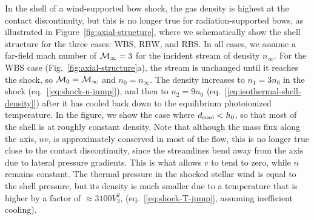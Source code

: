 In the shell of a wind-supported bow shock, the gas density is highest
at the contact discontinuity, but this is no longer true for
radiation-supported bows, as illustrated in
Figure~\ref{fig:axial-structure}, where we schematically show the
shell structure for the three cases: WBS, RBW, and RBS.  In all cases,
we assume a far-field mach number of \(\mathcal{M}_\infty = 3\) for the incident
stream of density \(n_\infty\).  For the WBS case
(Fig.~\ref{fig:axial-structure}a), the stream is unchanged until it
reaches the shock, so \(\mathcal{M}_0 = \mathcal{M}_\infty\) and \(n_0 = n_\infty\).  The density
increases to \(n_1 = 3 n_0\) in the shock
(eq.~[\ref{eq:shock-n-jump}]), and then to \(n_2 = 9 n_0\)
(eq.~[\ref{eq:isothermal-shell-density}]) after it has cooled back
down to the equilibrium photoionized temperature.  In the figure, we
show the case where \(d_{\text{cool}} < h_0\), so that most of the shell is at
roughly constant density.  Note that although the mass flux along the
axis, \(n v\), is approximately conserved in most of the flow, this is
no longer true close to the contact discontinuity, since the
streamlines bend away from the axis due to lateral pressure gradients.
This is what allows \(v\) to tend to zero, while \(n\) remains
constant.  The thermal pressure in the shocked stellar wind is equal
to the shell pressure, but its density is much smaller due to a
temperature that is higher by a factor of \(\approx 3100 V_3^2\),
(eq.~[\ref{eq:shock-T-jump}], assuming inefficient cooling).

